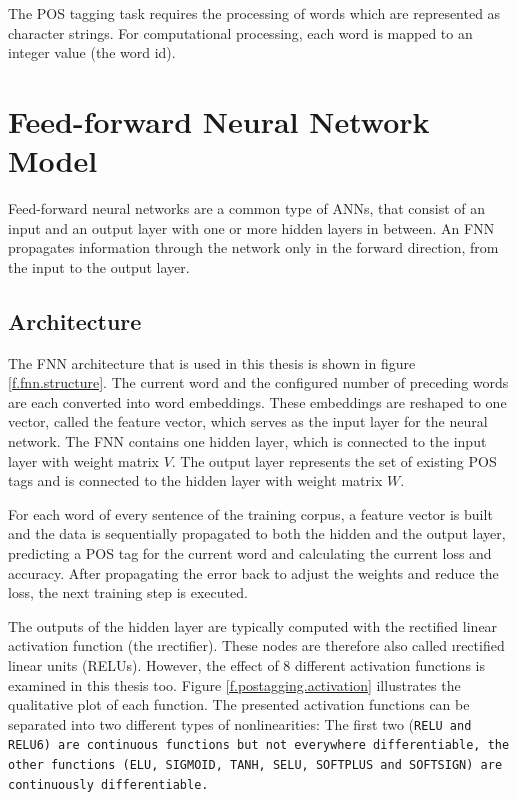The POS tagging task requires the processing of words which are represented as character strings. For computational processing, each word is mapped to an integer value (the word id).

\section{Feed-forward Neural Network Model}\label{c.postagging.fnn}
Feed-forward neural networks are a common type of ANNs, that consist of an input and an output layer with one or more hidden layers in between. An FNN propagates information through the network only in the forward direction, from the input to the output layer.

\subsection{Architecture}\label{c.postagging.fnn.architecture}
The FNN architecture that is used in this thesis is shown in figure \ref{f.fnn.structure}. The current word and the configured number of preceding words are each converted into word embeddings. These embeddings are reshaped to one vector, called the feature vector, which serves as the input layer for the neural network. The FNN contains one hidden layer, which is connected to the input layer with weight matrix $V$. The output layer represents the set of existing POS tags and is connected to the hidden layer with weight matrix $W$.

For each word of every sentence of the training corpus, a feature vector is built and the data is sequentially propagated to both the hidden and the output layer, predicting a POS tag for the current word and calculating the current loss and accuracy. After propagating the error back to adjust the weights and reduce the loss, the next training step is executed.

The outputs of the hidden layer are typically computed with the rectified linear activation function (the \i{rectifier}). These nodes are therefore also called \i{rectified linear units} (RELUs). However, the effect of 8 different activation functions is examined in this thesis too. Figure \ref{f.postagging.activation} illustrates the qualitative plot of each function. The presented activation functions can be separated into two different types of nonlinearities: The first two (\tt{RELU} and \tt{RELU6}) are continuous functions but not everywhere differentiable, the other functions (\tt{ELU}, \tt{SIGMOID}, \tt{TANH}, \tt{SELU}, \tt{SOFTPLUS} and \tt{SOFTSIGN}) are continuously differentiable.

